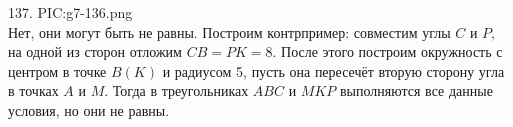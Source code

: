 137. {{PIC:g7-136.png}}\\
Нет, они могут быть не равны. Построим контрпример: совместим углы $C$ и $P,$ на одной из сторон отложим $CB=PK=8.$ После этого построим окружность с центром в точке $B(K)$ и радиусом 5, пусть она пересечёт вторую сторону угла в точках $A$ и $M.$ Тогда в треугольниках $ABC$ и $MKP$ выполняются все данные условия, но они не равны.\\
